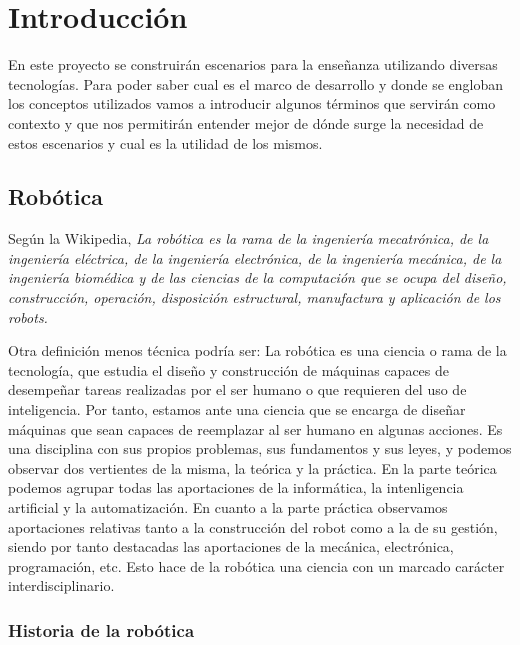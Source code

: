 \chapter{Introducción}
\label{ch:Introduccion}

En este proyecto se construirán escenarios para la enseñanza utilizando diversas tecnologías. Para poder saber cual es el marco de desarrollo y donde se engloban los conceptos utilizados vamos a introducir algunos términos que servirán como contexto y que nos permitirán entender mejor de dónde surge la necesidad de estos escenarios y cual es la utilidad de los mismos.

\section{Robótica}
\label{sec:intr_robotica}

Según la Wikipedia\cite{wikipedia}, \textit{La robótica es la rama de la ingeniería mecatrónica, de la ingeniería eléctrica, de la ingeniería electrónica, de la ingeniería mecánica, de la ingeniería biomédica y de las ciencias de la computación que se ocupa del diseño, construcción, operación, disposición estructural, manufactura y aplicación de los robots.}

Otra definición menos técnica podría ser: La robótica es una ciencia o rama de la tecnología, que estudia el diseño y construcción de máquinas capaces de desempeñar tareas realizadas por el ser humano o que requieren del uso de inteligencia. Por tanto, estamos ante una ciencia que se encarga de diseñar máquinas que sean capaces de reemplazar al ser humano en algunas acciones. Es una disciplina con sus propios problemas, sus fundamentos y sus leyes, y podemos observar dos vertientes de la misma, la teórica y la práctica. En la parte teórica podemos agrupar todas las aportaciones de la informática, la intenligencia artificial y la automatización. En cuanto a la parte práctica observamos aportaciones relativas tanto a la construcción del robot como a la de su gestión, siendo por tanto destacadas las aportaciones de la mecánica, electrónica, programación, etc. Esto hace de la robótica una ciencia con un marcado carácter interdisciplinario.

\subsection{Historia de la robótica}
\label{subsec:intr_historiarobotica}

